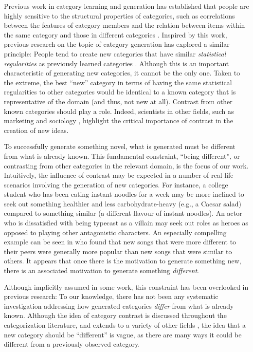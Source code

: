 \documentclass[12pt]{article}
\begin{document}
\begin{flushleft}
Previous work in category learning and generation has established that people
are highly sensitive to the structural properties of categories, such as
correlations between the features of category members and the relation between
items within the same category and those in different categories
\citep{roschmervis1975,regier2007,shepard1961learning,smith1995creative}.
Inspired by this work, previous research on the topic of category generation has
explored a similar principle: People tend to create new categories that have
similar {\em statistical regularities} as previously learned categories
\citep{jern2013probabilistic,ward1994structured}. Although this is an important
characteristic of generating new categories, it cannot be the only one. Taken to
the extreme, the best ``new'' category in terms of having the same statistical
regularities to other categories would be identical to a known category that is
representative of the domain (and thus, not new at all). Contrast from other
known categories should play a role. Indeed, scientists in other fields, such
as marketing \citep{berger16} and sociology \citep{rogers03}, highlight the
critical importance of contrast in the creation of new ideas.

To successfully generate something novel, what is generated must be different
from what is already known. This fundamental constraint, ``being different'', or
contrasting from other categories in the relevant domain, is the focus of our
work. Intuitively, the influence of contrast may be expected in a number of
real-life scenarios involving the generation of new categories. For instance, a
college student who has been eating instant noodles for a week may be more
inclined to seek out something healthier and less carbohydrate-heavy (e.g., a
Caesar salad) compared to something similar (a different flavour of instant
noodles). An actor who is dissatisfied with being typecast as a villain may seek
out roles as heroes as opposed to playing other antagonistic characters. An
especially compelling example can be seen in \cite{askin2017} who found that
new songs that were more different to their peers were generally more popular
than new songs that were similar to others. It appears that once there is the
motivation to generate something new, there is an associated motivation to
generate something \emph{different}. 

Although implicitly assumed in some work, this constraint has been
overlooked in previous research: To our knowledge, there has not been any
systematic investigation addressing how generated categories {\em differ} from
what is already known. Although the idea of category contrast is discussed
throughout the categorization literature, and extends to a variety of other
fields \citep[e.g., color;][]{regier2007}, the idea that a new category should
be ``different'' is vague, as there are many ways it could be different from a
previously observed category.


\end{flushleft}
\end{document}
